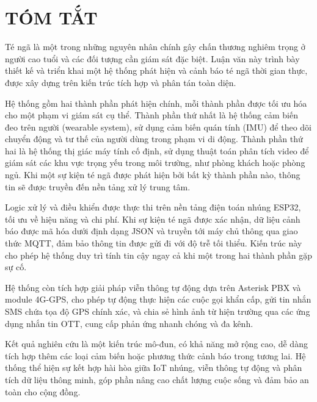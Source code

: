 
\chapter*{TÓM TẮT}

Té ngã là một trong những nguyên nhân chính gây chấn thương nghiêm trọng ở người cao tuổi và các đối tượng cần giám sát đặc biệt. Luận văn này trình bày thiết kế và triển khai một hệ thống phát hiện và cảnh báo té ngã thời gian thực, được xây dựng trên kiến trúc tích hợp và phân tán toàn diện.

Hệ thống gồm hai thành phần phát hiện chính, mỗi thành phần được tối ưu hóa cho một phạm vi giám sát cụ thể. Thành phần thứ nhất là hệ thống cảm biến đeo trên người (wearable system), sử dụng cảm biến quán tính (IMU) để theo dõi chuyển động và tư thế của người dùng trong phạm vi di động. Thành phần thứ hai là hệ thống thị giác máy tính cố định, sử dụng thuật toán phân tích video để giám sát các khu vực trọng yếu trong môi trường, như phòng khách hoặc phòng ngủ. Khi một sự kiện té ngã được phát hiện bởi bất kỳ thành phần nào, thông tin sẽ được truyền đến nền tảng xử lý trung tâm.

Logic xử lý và điều khiển được thực thi trên nền tảng điện toán nhúng ESP32, tối ưu về hiệu năng và chi phí. Khi sự kiện té ngã được xác nhận, dữ liệu cảnh báo được mã hóa dưới định dạng JSON và truyền tới máy chủ thông qua giao thức MQTT, đảm bảo thông tin được gửi đi với độ trễ tối thiểu. Kiến trúc này cho phép hệ thống duy trì tính tin cậy ngay cả khi một trong hai thành phần gặp sự cố.

Hệ thống còn tích hợp giải pháp viễn thông tự động dựa trên Asterisk PBX và module 4G-GPS, cho phép tự động thực hiện các cuộc gọi khẩn cấp, gửi tin nhắn SMS chứa tọa độ GPS chính xác, và chia sẻ hình ảnh từ hiện trường qua các ứng dụng nhắn tin OTT, cung cấp phản ứng nhanh chóng và đa kênh.

Kết quả nghiên cứu là một kiến trúc mô-đun, có khả năng mở rộng cao, dễ dàng tích hợp thêm các loại cảm biến hoặc phương thức cảnh báo trong tương lai. Hệ thống thể hiện sự kết hợp hài hòa giữa IoT nhúng, viễn thông tự động và phân tích dữ liệu thông minh, góp phần nâng cao chất lượng cuộc sống và đảm bảo an toàn cho cộng đồng.
